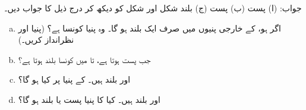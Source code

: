   جواب: (ا) پست (ب) پست (ج) بلند
 شکل   اور  شکل   کو دیکھ کر درج ذیل کا جواب دیں۔
 \begin{enumerate}[a.]
 \item
 اگر  ہو،  کے خارجی پنیوں میں صرف ایک بلند ہو گا۔ وہ پنیا کونسا ہے؟ (پنیا  اور    نظرانداز کریں۔)
 \item
 جب  پست ہوتا ہے،  تا  میں  کونسا بلند ہوتا ہے؟
 \item
{}اور  بلند ہیں۔  کے پنیا  پر کیا ہو گا؟
\item
{} اور   بلند ہیں۔ کیا  کا  پنیا  پست یا بلند ہو گا؟
 \end{enumerate}

